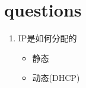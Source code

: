 \documentclass[UTF8]{article}
\begin{document}
 \section{questions}%
 \label{sec:questions}
 
 \begin{enumerate}
   \item IP是如何分配的
   \begin{itemize}
     \item 静态
     \item 动态(DHCP)
   \end{itemize}
 \end{enumerate}
 
\end{document}
